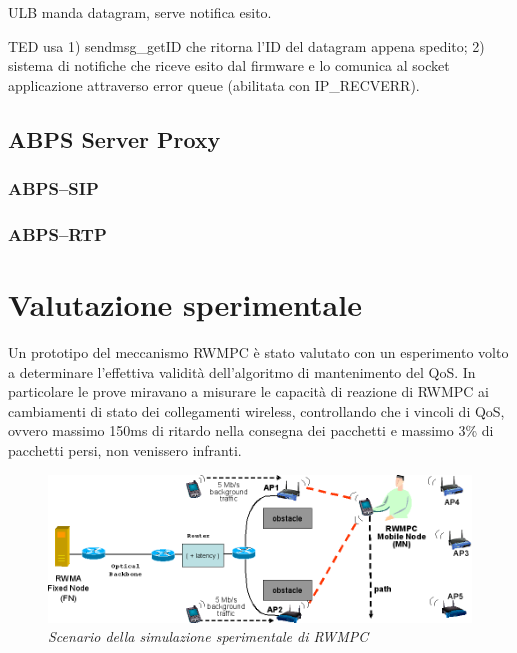 \documentclass[12pt,a4paper,openright,twoside]{book}
\begin{document}
ULB manda datagram, serve notifica esito.

TED usa 1) sendmsg\_getID che ritorna l'ID del datagram appena
spedito; 2) sistema di notifiche che riceve esito dal firmware e lo
comunica al socket applicazione attraverso error queue (abilitata con
IP\_RECVERR).

\subsection{ABPS Server Proxy}

\subsubsection{ABPS--SIP}

\subsubsection{ABPS--RTP}

\section{Valutazione sperimentale}

Un prototipo del meccanismo RWMPC è stato valutato con un esperimento
volto a determinare l'effettiva validità dell'algoritmo di
mantenimento del QoS. In particolare le prove miravano a misurare le
capacità di reazione di RWMPC ai cambiamenti di stato dei collegamenti
wireless, controllando che i vincoli di QoS, ovvero massimo 150ms di
ritardo nella consegna dei pacchetti e massimo 3\% di pacchetti persi,
non venissero infranti.

\begin{figure}
  \centering
  \includegraphics[width=\textwidth]{img/abps-simulazione}
  \caption{\em Scenario della simulazione sperimentale di RWMPC}
  \label{fig:abps:simulazione}
\end{figure}
\end{document}
